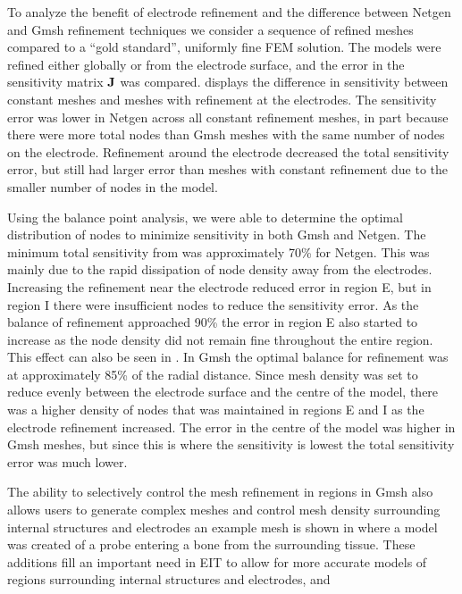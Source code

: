 To analyze the benefit of electrode refinement and the difference between 
Netgen and Gmsh refinement techniques we consider
a sequence of refined meshes compared to a ``gold standard'', uniformly fine
FEM solution. The models were refined either globally or from the electrode surface, 
and the error in the sensitivity matrix $\bf J$ 
was compared.  displays the difference 
in sensitivity between constant meshes and meshes with refinement at the electrodes. 
The sensitivity error was lower in Netgen across all constant refinement meshes, in
part because there were more total nodes than Gmsh meshes with the same number
of nodes on the electrode. Refinement around the electrode decreased the total 
sensitivity error, but still had larger error than meshes with constant refinement 
due to the smaller number of nodes in the model. 

Using the balance point analysis, we were able to determine the optimal distribution
of nodes to minimize sensitivity in both Gmsh and Netgen. The minimum total sensitivity 
from  was approximately 70\% for Netgen. This was mainly 
due to the rapid dissipation of node density away from the electrodes. Increasing 
the refinement near the electrode reduced
error in region E, but in region I there were insufficient
nodes to reduce the sensitivity error. As the balance of refinement approached
90\% the error in region E also started to increase as the node density did not remain
fine throughout the entire region. This effect can also be seen in .
In Gmsh the optimal balance for refinement was at approximately 85\%
of the radial distance. Since mesh density was set to reduce evenly 
between the electrode surface and the centre of the model, there 
was a higher density of nodes that was maintained in regions E and I as the 
electrode refinement increased. The error in the centre of the model 
was higher in Gmsh meshes, but since this is where the sensitivity is 
lowest the total sensitivity error was much lower. 

The ability to selectively control the mesh refinement in regions in Gmsh also allows 
users to generate complex meshes and control mesh density surrounding internal structures 
and electrodes an example mesh is shown in  where a model was
created of
a probe entering a bone from the surrounding tissue. 
These additions fill an important need in EIT to allow for more accurate models 
of regions surrounding internal structures and electrodes, and 

